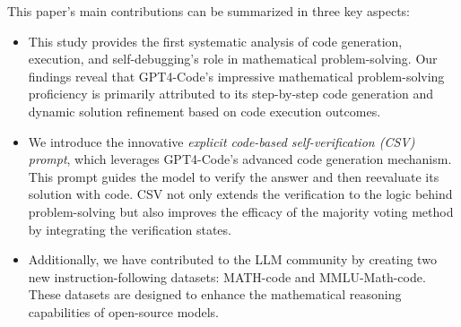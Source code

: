\documentclass{article} \usepackage{iclr2023_conference,times}
\newcommand{\gptcode}{GPT4-Code}
\begin{document}
This paper's main contributions can be summarized in three key aspects:
\begin{itemize}
\item
This study provides the first systematic analysis of code generation, execution, and self-debugging's role in mathematical problem-solving. Our findings reveal that \gptcode's impressive mathematical problem-solving proficiency is primarily attributed to its step-by-step code generation and dynamic solution refinement based on code execution outcomes.

\item
We introduce the innovative \textit{explicit code-based self-verification (CSV) prompt}, which leverages \gptcode's advanced code generation mechanism. This prompt guides the model to verify the answer and then reevaluate its solution with code. CSV not only extends the verification to the logic behind problem-solving but also improves the efficacy of the majority voting method by integrating the verification states.
\item 
{Additionally, we have contributed to the LLM community by creating two new instruction-following datasets: MATH-code and MMLU-Math-code. These datasets are designed to enhance the mathematical reasoning capabilities of open-source models.}
\end{itemize}





    
\end{document}
